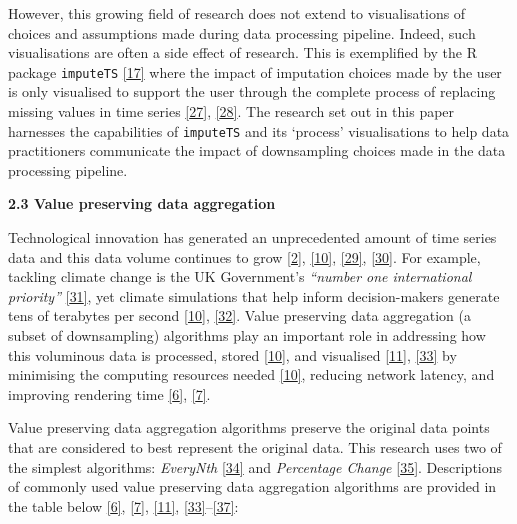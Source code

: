 \documentclass{article}
\begin{document}
However, this growing field of research does not extend to
visualisations of choices and assumptions made during data processing
pipeline. Indeed, such visualisations are often a side effect of
research. This is exemplified by the R package \texttt{imputeTS}
\protect\hyperlink{ref-imputeTS_R}{{[}17{]}} where the impact of
imputation choices made by the user is only visualised to support the
user through the complete process of replacing missing values in time
series \protect\hyperlink{ref-imputeTS}{{[}27{]}},
\protect\hyperlink{ref-missingdata}{{[}28{]}}. The research set out in
this paper harnesses the capabilities of \texttt{imputeTS} and its
`process' visualisations to help data practitioners communicate the
impact of downsampling choices made in the data processing pipeline.

\textbf{2.3 Value preserving data aggregation}

Technological innovation has generated an unprecedented amount of time
series data and this data volume continues to grow
\protect\hyperlink{ref-data2020}{{[}2{]}},
\protect\hyperlink{ref-TVStore}{{[}10{]}},
\protect\hyperlink{ref-storage}{{[}29{]}},
\protect\hyperlink{ref-CatchUp}{{[}30{]}}. For example, tackling climate
change is the UK Government's \emph{``number one international
priority''} \protect\hyperlink{ref-IR}{{[}31{]}}, yet climate
simulations that help inform decision-makers generate tens of terabytes
per second \protect\hyperlink{ref-TVStore}{{[}10{]}},
\protect\hyperlink{ref-climate}{{[}32{]}}. Value preserving data
aggregation (a subset of downsampling) algorithms play an important role
in addressing how this voluminous data is processed, stored
\protect\hyperlink{ref-TVStore}{{[}10{]}}, and visualised
\protect\hyperlink{ref-Sveinn}{{[}11{]}},
\protect\hyperlink{ref-dashql}{{[}33{]}} by minimising the computing
resources needed \protect\hyperlink{ref-TVStore}{{[}10{]}}, reducing
network latency, and improving rendering time
\protect\hyperlink{ref-datapoint}{{[}6{]}},
\protect\hyperlink{ref-MinMaxLTTB}{{[}7{]}}.

Value preserving data aggregation algorithms preserve the original data
points that are considered to best represent the original data. This
research uses two of the simplest algorithms: \emph{EveryNth}
\protect\hyperlink{ref-EveryNth}{{[}34{]}} and \emph{Percentage Change}
\protect\hyperlink{ref-boxcar}{{[}35{]}}. Descriptions of commonly used
value preserving data aggregation algorithms are provided in the table
below \protect\hyperlink{ref-datapoint}{{[}6{]}},
\protect\hyperlink{ref-MinMaxLTTB}{{[}7{]}},
\protect\hyperlink{ref-Sveinn}{{[}11{]}},
\protect\hyperlink{ref-dashql}{{[}33{]}}--\protect\hyperlink{ref-M4}{{[}37{]}}:
\end{document}
